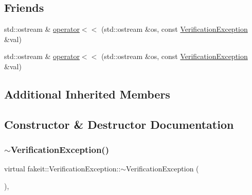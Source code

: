 \subsection*{Friends}
\begin{DoxyCompactItemize}
\item 
std\+::ostream \& \mbox{\hyperlink{structfakeit_1_1VerificationException_aa98da35f957de7b536fe6755789e97de}{operator$<$$<$}} (std\+::ostream \&os, const \mbox{\hyperlink{structfakeit_1_1VerificationException}{Verification\+Exception}} \&val)
\item 
std\+::ostream \& \mbox{\hyperlink{structfakeit_1_1VerificationException_aa98da35f957de7b536fe6755789e97de}{operator$<$$<$}} (std\+::ostream \&os, const \mbox{\hyperlink{structfakeit_1_1VerificationException}{Verification\+Exception}} \&val)
\end{DoxyCompactItemize}
\subsection*{Additional Inherited Members}


\subsection{Constructor \& Destructor Documentation}
\mbox{\label{structfakeit_1_1VerificationException_a3b59826b297c4022ab36f06237daaba7}} 
\subsubsection{\texorpdfstring{$\sim$VerificationException()}{~VerificationException()}\hspace{0.1cm}{\footnotesize\ttfamily [1/4]}}
{\footnotesize\ttfamily virtual fakeit\+::\+Verification\+Exception\+::$\sim$\+Verification\+Exception (\begin{DoxyParamCaption}{ }\end{DoxyParamCaption})\hspace{0.3cm}{\ttfamily [virtual]}, {\ttfamily [default]}}

\mbox{\label{structfakeit_1_1VerificationException_aa0e95a9d61ff4d6aeb185cadb033fc93}} 

